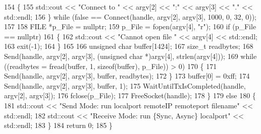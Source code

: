 \begin{DoxyCode}
154         \{
155             std::cout << "Connect to " << argv[2] << ":" << argv[3] << "." << std::endl;
156         \} while (false == Connect(handle, argv[2], argv[3], 1000, 0, 32, 0));
157 
158         FILE *p\_File = nullptr;
159         p\_File = fopen(argv[4], "r");
160         if (p\_File == nullptr)
161         \{
162             std::cout << "Cannot open file " << argv[4] << std::endl;
163             exit(-1);
164         \}
165 
166         unsigned char buffer[1424];
167         size\_t readbytes;
168         Send(handle, argv[2], argv[3], (unsigned char *)argv[4], strlen(argv[4]));
169         while ((readbytes = fread(buffer, 1, sizeof(buffer), p\_File)) > 0)
170         \{
171             Send(handle, argv[2], argv[3], buffer, readbytes);
172         \}
173         buffer[0] = 0xff;
174         Send(handle, argv[2], argv[3], buffer, 1);
175         WaitUntilTxIsCompleted(handle, argv[2], argv[3]);
176         fclose(p\_File);
177         FreeSocket(handle);
178     \}
179     else
180     \{
181         std::cout << "Send Mode: run localport remoteIP remoteport filename" << std::endl;
182         std::cout << "Receive Mode: run \{Sync, Async\} localport" << std::endl;
183     \}
184     return 0;
185 \}
\end{DoxyCode}
 